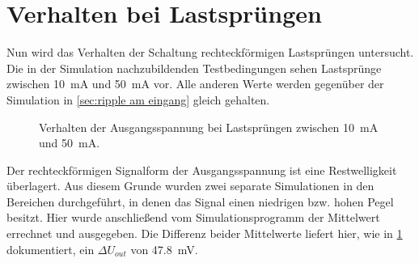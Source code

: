 	\section{Verhalten bei Lastsprüngen}
		Nun wird das Verhalten der Schaltung rechteckförmigen Lastsprüngen untersucht. Die in der Simulation nachzubildenden Testbedingungen
		sehen Lastsprünge zwischen \SI{10}{mA} und \SI{50}{mA} vor. Alle anderen Werte werden gegenüber der Simulation in \cref{sec:ripple am eingang} gleich gehalten.
		\begin{figure}[h]
			\centering
			
			\caption[Verhalten der Ausgangsspannung bei Lastsprüngen]{Verhalten der Ausgangsspannung bei Lastsprüngen zwischen \SI{10}{mA} und \SI{50}{mA}.}
			\label{fig:lastspruenge}
		\end{figure}
		Der rechteckförmigen Signalform der Ausgangsspannung ist eine Restwelligkeit überlagert. Aus diesem Grunde wurden zwei separate Simulationen
		in den Bereichen durchgeführt, in denen das Signal einen niedrigen bzw. hohen Pegel besitzt. Hier wurde anschließend
		vom Simulationsprogramm der Mittelwert errechnet und ausgegeben. Die Differenz beider Mittelwerte liefert hier, wie in \cref{fig:lastspruenge}
		dokumentiert, ein \(\Delta U_{out}\) von \SI{47,8}{mV}.

